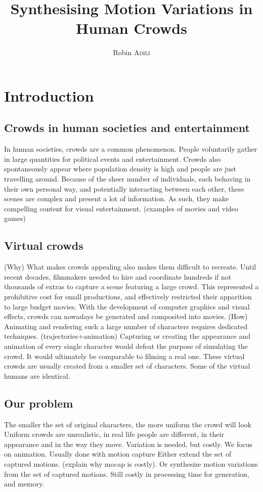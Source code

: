 \documentclass[11pt]{sdm}
\title{Synthesising Motion Variations in Human Crowds}
\author{Robin \textsc{Adili}}
\begin{document}
\maketitle

\section{Introduction}

\subsection{Crowds in human societies and entertainment}
In human societies, crowds are a common phenomenon. People voluntarily gather in large quantities for political events and entertainment. Crowds also spontaneously appear where population density is high and people are just travelling around. 
Because of the sheer number of individuals, each behaving in their own personal way, and potentially interacting between each other, these scenes are complex and present a lot of information.
As such, they make compelling content for visual entertainment.
(examples of movies and video games)

\subsection{Virtual crowds}
(Why)
What makes crowds appealing also makes them difficult to recreate. Until recent decades, filmmakers needed to hire and coordinate hundreds if not thousands of extras to capture a scene featuring a large crowd. This represented a prohibitive cost for small productions, and effectively restricted their apparition to large budget movies.
With the development of computer graphics and visual effects, crowds can nowadays be generated and composited into movies.
(How)
Animating and rendering such a large number of characters requires dedicated techniques.
(trajectories+animation)
Capturing or creating the appearance and animation of every single character would defeat the purpose of simulating the crowd. It would ultimately be comparable to filming a real one.
These virtual crowds are usually created from a smaller set of characters. Some of the virtual humans are identical.

\subsection{Our problem}
The smaller the set of original characters, the more uniform the crowd will look
Uniform crowds are unrealistic, in real life people are different, in their appearance and in the way they move.
Variation is needed, but costly.
We focus on animation. Usually done with motion capture
Either extend the set of captured motions. (explain why mocap is costly). 
Or synthesize motion variations from the set of captured motions. Still costly in processing time for generation, and memory.
\end{document}
